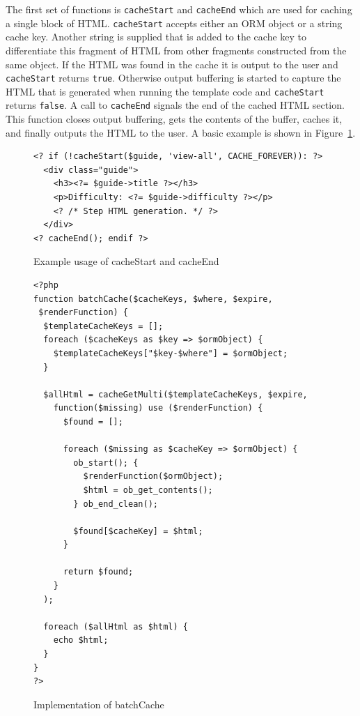 \documentclass[12pt]{ucthesis}
\begin{document}
The first set of functions is {\tt cacheStart} and {\tt cacheEnd} which are used for caching a single block of HTML\@.
{\tt cacheStart} accepts either an ORM object or a string cache key.
Another string is supplied that is added to the cache key to differentiate this fragment of HTML from other fragments constructed from the same object.
If the HTML was found in the cache it is output to the user and {\tt cacheStart} returns {\tt true}.
Otherwise output buffering is started to capture the HTML that is generated when running the template code and {\tt cacheStart} returns {\tt false}.
A call to {\tt cacheEnd} signals the end of the cached HTML section.
This function closes output buffering, gets the contents of the buffer, caches it, and finally outputs the HTML to the user.
A basic example is shown in Figure~\ref{fig:cacheStartExample}.

\begin{figure}[h]
\begin{ssp}
\begin{verbatim}
<? if (!cacheStart($guide, 'view-all', CACHE_FOREVER)): ?>
  <div class="guide">
    <h3><?= $guide->title ?></h3>
    <p>Difficulty: <?= $guide->difficulty ?></p>
    <? /* Step HTML generation. */ ?>
  </div>
<? cacheEnd(); endif ?>
\end{verbatim}
\caption{Example usage of cacheStart and cacheEnd}
\label{fig:cacheStartExample}
\end{ssp}
\end{figure}

\begin{figure}[hbtp]
\begin{ssp}
\begin{verbatim}
<?php
function batchCache($cacheKeys, $where, $expire,
 $renderFunction) {
  $templateCacheKeys = [];
  foreach ($cacheKeys as $key => $ormObject) {
    $templateCacheKeys["$key-$where"] = $ormObject;
  }

  $allHtml = cacheGetMulti($templateCacheKeys, $expire,
    function($missing) use ($renderFunction) {
      $found = [];

      foreach ($missing as $cacheKey => $ormObject) {
        ob_start(); {
          $renderFunction($ormObject);
          $html = ob_get_contents();
        } ob_end_clean();

        $found[$cacheKey] = $html;
      }

      return $found;
    }
  );

  foreach ($allHtml as $html) {
    echo $html;
  }
}
?>
\end{verbatim}
\caption{Implementation of batchCache}
\label{fig:batchCacheImplementation}
\end{ssp}
\end{figure}
\end{document}

